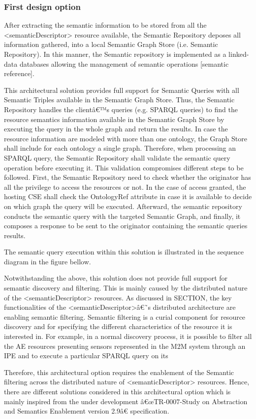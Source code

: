 \subsubsection*{First design option}
After extracting the semantic information to be stored from all the <semanticDescriptor> resource available, the Semantic Repository deposes all information gathered, into a local Semantic Graph Store (i.e. Semantic Repository). In this manner, the Semantic repository is implemented as a linked-data databases allowing the management of semantic operations [semantic reference]. \par
This architectural solution provides full support for Semantic Queries with all Semantic Triples available in the Semantic Graph Store. Thus, the Semantic Repository handles the clientâ€™s queries (e.g. SPARQL queries) to find the resource semantics information available in the Semantic Graph Store by executing the query in the whole graph and return the results. In case the resource information are modeled with more than one ontology, the Graph Store shall include for each ontology a single graph. Therefore, when processing an SPARQL query, the Semantic Repository shall validate the semantic query operation before executing it. This validation compromises different steps to be followed. First, the Semantic Repository need to check whether the originator has all the privilege to access the resources or not. In the case of access granted, the hosting CSE shall check the OntologyRef attribute in case it is available to decide on which graph the query will be executed. Afterward, the semantic repository conducts the semantic query with the targeted Semantic Graph, and finally, it composes a response to be sent to the originator containing the semantic queries results. \item
The semantic query execution within this solution is illustrated in the sequence diagram in the figure bellow.

 Notwithstanding the above, this solution does not provide full support for semantic discovery and filtering. This is mainly caused by the distributed nature of the <semanticDescriptor> resources. As discussed in SECTION, the key functionalities of the <semanticDescriptor>â€˜s distributed architecture are enabling semantic filtering. Semantic filtering is a curial component for resource discovery and for specifying the different characteristics of the resource it is interested in. For example, in a normal discovery process, it is possible to filter all the AE resources presenting sensors represented in the M2M system through an IPE and to execute a particular SPARQL query on its \par
  Therefore, this architectural option requires the enablement of the Semantic filtering across the distributed nature of <semanticDescriptor> resources. Hence, there are different solutions considered in this architectural option which is mainly inspired from the under development â€œTR-0007-Study on Abstraction and Semantics Enablement version 2.9â€ specification.


